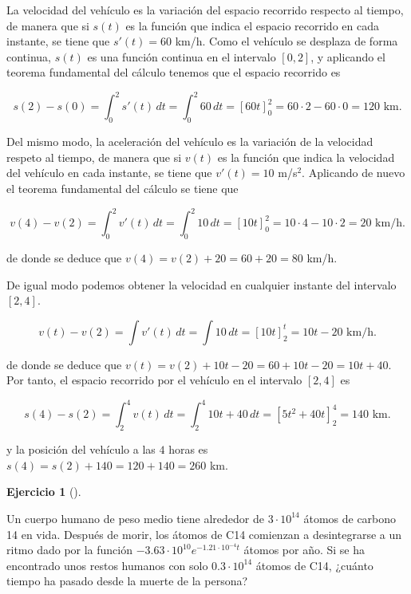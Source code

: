 \documentclass[
  spanish,
  a4paper,
]{scrreport}
\theoremstyle{definition}
\newtheorem{exercise}{Ejercicio}[chapter]
\theoremstyle{remark}
\begin{document}
\begin{tcolorbox}[enhanced jigsaw, arc=.35mm, bottomrule=.15mm, bottomtitle=1mm, breakable, colback=white, colbacktitle=quarto-callout-tip-color!10!white, colframe=quarto-callout-tip-color-frame, coltitle=black, left=2mm, leftrule=.75mm, opacityback=0, opacitybacktitle=0.6, rightrule=.15mm, title=\textcolor{quarto-callout-tip-color}{\faLightbulb}\hspace{0.5em}{Solución}, titlerule=0mm, toprule=.15mm, toptitle=1mm]

La velocidad del vehículo es la variación del espacio recorrido respecto
al tiempo, de manera que si \(s(t)\) es la función que indica el espacio
recorrido en cada instante, se tiene que \(s'(t)=60\) km/h. Como el
vehículo se desplaza de forma continua, \(s(t)\) es una función continua
en el intervalo \([0,2]\), y aplicando el teorema fundamental del
cálculo tenemos que el espacio recorrido es

\[
s(2) - s(0) 
= \int_0^2 s'(t)\,dt 
= \int_0^2 60\,dt 
= [60t]_0^2
= 60\cdot 2 - 60\cdot 0
= 120\text{ km}.
\]

Del mismo modo, la aceleración del vehículo es la variación de la
velocidad respeto al tiempo, de manera que si \(v(t)\) es la función que
indica la velocidad del vehículo en cada instante, se tiene que
\(v'(t)=10\) m/s\(^2\). Aplicando de nuevo el teorema fundamental del
cálculo se tiene que

\[
v(4) - v(2) 
= \int_0^2 v'(t)\,dt
= \int_0^2 10\,dt
= [10t]_0^2
= 10\cdot 4 - 10\cdot 2
= 20\text{ km/h}.
\]

de donde se deduce que \(v(4) = v(2) + 20 = 60 + 20 = 80\) km/h.

De igual modo podemos obtener la velocidad en cualquier instante del
intervalo \([2,4]\).

\[
v(t) - v(2)
= \int v'(t)\,dt 
= \int 10\,dt 
= [10t]_2^t
= 10t - 20\text{ km/h}.
\]

de donde se deduce que
\(v(t) = v(2) + 10t - 20 = 60 + 10t -20 = 10t+40\). Por tanto, el
espacio recorrido por el vehículo en el intervalo \([2,4]\) es

\[
s(4) - s(2)
= \int_2^4 v(t)\,dt
= \int_2^4 10t + 40\,dt
= [5t^2 + 40t]_2^4
= 140 \text{ km}.
\]

y la posición del vehículo a las \(4\) horas es
\(s(4) = s(2) + 140 = 120 + 140 = 260\) km.

\end{tcolorbox}

\begin{exercise}[]\protect\hypertarget{exr-desintegracion-radioactiva}{}\label{exr-desintegracion-radioactiva}

Un cuerpo humano de peso medio tiene alrededor de \(3\cdot 10^{14}\)
átomos de carbono 14 en vida. Después de morir, los átomos de C14
comienzan a desintegrarse a un ritmo dado por la función
\(-3.63\cdot 10^{10}e^{-1.21\cdot 10^{-4}t}\) átomos por año. Si se ha
encontrado unos restos humanos con solo \(0.3\cdot 10^{14}\) átomos de
C14, ¿cuánto tiempo ha pasado desde la muerte de la persona?

\end{exercise}
\end{document}
